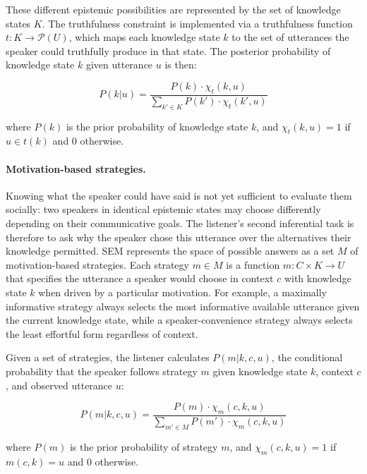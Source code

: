 \documentclass[12pt,a4paper]{article}
\begin{document}
These different epistemic possibilities are represented by the set of knowledge
states $K$. The truthfulness constraint is implemented via a truthfulness
function $t: K \rightarrow \mathcal{P}(U)$, which maps each knowledge state $k$
to the set of utterances the speaker could truthfully produce in that state.
The posterior probability of knowledge state $k$ given utterance $u$ is then:

\begin{equation}
P(k|u) = \frac{P(k) \cdot \chi_t(k,u)}
               {\sum_{k' \in K} P(k') \cdot \chi_t(k',u)}
\label{eq2}
\end{equation}

\noindent where $P(k)$ is the prior probability of knowledge state $k$, and
$\chi_t(k,u) = 1$ if $u \in t(k)$ and $0$ otherwise.

\paragraph{Motivation-based strategies.}
Knowing what the speaker could have said is not yet sufficient to evaluate them
socially: two speakers in identical epistemic states may choose differently
depending on their communicative goals. The listener's second inferential task
is therefore to ask why the speaker chose this utterance over the alternatives
their knowledge permitted. SEM represents the space of possible answers as a
set $M$ of motivation-based strategies. Each strategy $m \in M$ is a function
$m: C \times K \rightarrow U$ that specifies the utterance a speaker would
choose in context $c$ with knowledge state $k$ when driven by a particular
motivation. For example, a maximally informative strategy always selects the
most informative available utterance given the current knowledge state, while a
speaker-convenience strategy always selects the least effortful form regardless
of context.

Given a set of strategies, the listener calculates $P(m|k,c,u)$, the
conditional probability that the speaker follows strategy $m$ given knowledge
state $k$, context $c$, and observed utterance $u$:

\begin{equation}
P(m|k,c,u) = \frac{P(m) \cdot \chi_m(c,k,u)}
                  {\sum_{m' \in M} P(m') \cdot \chi_m(c,k,u)}
\label{eq3}
\end{equation}

\noindent where $P(m)$ is the prior probability of strategy $m$, and
$\chi_m(c,k,u) = 1$ if $m(c,k) = u$ and $0$ otherwise.
\end{document}
